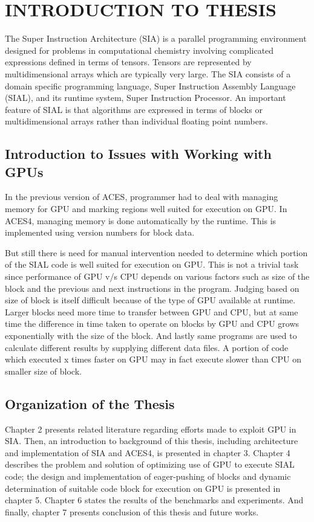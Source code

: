\chapter{INTRODUCTION TO THESIS} \label{intro}

The Super Instruction Architecture (SIA) is a parallel programming environment
designed for problems in computational chemistry involving complicated
expressions defined in terms of tensors. Tensors are represented by
multidimensional arrays which are typically very large. The SIA consists of a
domain specific programming language, Super Instruction Assembly Language
(SIAL), and its runtime system, Super Instruction Processor. An important
feature of SIAL is that algorithms are expressed in terms of blocks or
multidimensional arrays rather than individual floating point numbers.

\section{Introduction to Issues with Working with GPUs}

In the previous version of ACES, programmer had to deal with managing memory for
GPU and marking regions well suited for execution on GPU. In ACES4, managing
memory is done automatically by the runtime. This is implemented using version
numbers for block data.

But still there is need for manual intervention needed to determine which
portion of the SIAL code is well suited for execution on GPU. This is not a
trivial task since performance of GPU v/s CPU depends on various factors such as
size of the block and the previous and next instructions in the program. Judging
based on size of block is itself difficult because of the type of GPU available
at runtime. Larger blocks need more time to transfer between GPU and CPU, but at
same time the difference in time taken to operate on blocks by GPU and CPU grows
exponentially with the size of the block. And lastly same programs are used to
calculate different results by supplying different data files. A portion of code
which executed x times faster on GPU may in fact execute slower than CPU on
smaller size of block.

\section{Organization of the Thesis}
Chapter 2 presents related literature regarding efforts made to exploit GPU in
SIA. Then, an introduction to background of this thesis, including architecture
and implementation of SIA and ACES4, is presented in chapter 3. Chapter 4
describes the problem and solution of optimizing use of GPU to execute SIAL
code; the design and implementation of eager-pushing of blocks and dynamic
determination of suitable code block for execution on GPU is presented in
chapter 5. Chapter 6 states the results of the benchmarks and experiments. And
finally, chapter 7 presents conclusion of this thesis and future works.

